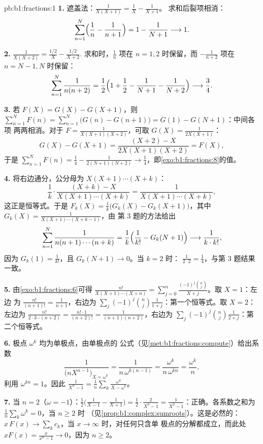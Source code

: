 \begin{solution}{pb:b1:fractions:1}
\textbf{1.} 遮盖法：$\frac1{X(X+1)} = \frac1X - \frac1{X+1}$。
求和后裂项相消：
\[
\sum_{n=1}^{N}\Bigl(\frac1n - \frac1{n+1}\Bigr)
= 1 - \frac1{N+1} \longrightarrow 1 .
\]

\textbf{2.} $\frac1{X(X+2)} = \frac{1/2}X - \frac{1/2}{X+2}$.
求和时，$\frac1n$ 项在 $n = 1, 2$ 时保留，而
$-\frac1{n+2}$ 项在 $n = N-1, N$ 时保留：
\[
\sum_{n=1}^{N}\frac1{n(n+2)}
= \frac12\Bigl(1 + \frac12 - \frac1{N+1} - \frac1{N+2}\Bigr)
\longrightarrow \frac34 .
\]

\textbf{3.} 若 $F(X) = G(X) - G(X+1)$，则 $\sum_{n=1}^N F(n) =
\sum_{n=1}^N\bigl(G(n) - G(n+1)\bigr) = G(1) - G(N+1)$：中间各项
两两相消。对于 $F =
\frac1{X(X+1)(X+2)}$，可取 $G(X) = \frac1{2X(X+1)}$：
\[
G(X) - G(X+1)
= \frac{(X+2) - X}{2X(X+1)(X+2)} = F(X) ,
\]
于是 $\sum_{n=1}^N F(n) = \frac14 - \frac1{2(N+1)(N+2)} \to
\frac14$，即\cref{exo:b1:fractions:8}的值。

\textbf{4.} 将右边通分，公分母为
$X(X+1)\cdots(X+k)$：
\[
\frac1k\cdot\frac{(X + k) - X}{X(X+1)\cdots(X+k)}
= \frac{1}{X(X+1)\cdots(X+k)} ,
\]
这正是恒等式。于是 $F_k(X) = \frac1k\bigl(G_k(X) -
G_k(X+1)\bigr)$，其中 $G_k(X) = \frac1{X(X+1)\cdots(X+k-1)}$，由
第 3 题的方法给出
\[
\sum_{n=1}^{N}\frac1{n(n+1)\cdots(n+k)}
= \frac1k\Bigl(\frac1{k!} - G_k(N+1)\Bigr)
\longrightarrow \frac1{k\cdot k!} ,
\]
因为 $G_k(1) = \frac1{k!}$，且 $G_k(N+1) \to 0$。当 $k = 2$ 时：
$\frac1{2\cdot2} = \frac14$，与第 3 题结果一致。

\textbf{5.} 由\cref{exo:b1:fractions:6}可得
$\frac{n!}{X(X+1)\cdots(X+n)} = \sum_{j=0}^n
\frac{(-1)^j\binom nj}{X + j}$。取 $X = 1$：左边
为 $\frac{n!}{(n+1)!} = \frac1{n+1}$，右边为
$\sum_j(-1)^j\binom nj\frac1{1+j}$：第一个恒等式。取 $X = 2$：
左边为 $\frac{n!}{2\cdot3\cdots(n+2)} =
\frac{n!\cdot1}{(n+2)!} = \frac1{(n+1)(n+2)}$，右边为
$\sum_j(-1)^j\binom nj\frac1{2+j}$：第二个恒等式。

\textbf{6.} 极点 $\omega^k$ 均为单极点，由单极点的
公式（见\cref{met:b1:fractions:compute}）给出系数
\[
\frac{1}{\bigl(nX^{n-1}\bigr)_{X = \omega^k}}
= \frac{1}{n\,\omega^{k(n-1)}}
= \frac{\omega^k}{n\,\omega^{kn}} = \frac{\omega^k}n ,
\]
利用 $\omega^{kn} = 1$。因此 $\frac1{X^n-1} = \frac1n\sum_k
\frac{\omega^k}{X - \omega^k}$。

\textbf{7.} 当 $n = 2$（$\omega = -1$）：$\frac12\bigl(
\frac1{X-1} - \frac1{X+1}\bigr) = \frac12\cdot\frac{2}{X^2-1} =
\frac1{X^2-1}$：正确。各系数之和为
$\frac1n\sum_k\omega^k = 0$，当 $n \geq 2$ 时
（见\cref{prop:b1:complex:sumroots}）。这是必然的：$x\,F(x) \to
\sum_k c_k$，当 $x \to \infty$ 时，对任何只含单
极点的分解都成立，而此处 $xF(x) = \frac{x}{x^n-1} \to 0$，因为 $n \geq
2$。


\end{solution}
